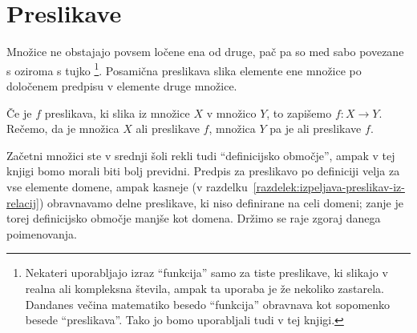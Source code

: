 \section{Preslikave}


Množice ne obstajajo povsem ločene ena od druge, pač pa so med sabo povezane s  oziroma s tujko \footnote{Nekateri uporabljajo izraz ``funkcija'' samo za tiste preslikave, ki slikajo v realna ali kompleksna števila, ampak ta uporaba je že nekoliko zastarela. Dandanes večina matematiko besedo ``funkcija'' obravnava kot sopomenko besede ``preslikava''. Tako jo bomo uporabljali tudi v tej knjigi.}. Posamična preslikava slika elemente ene množice po določenem predpisu v elemente druge množice.

Če je $f$ preslikava, ki slika iz množice $X$ v množico $Y$, to zapišemo $f\colon X \to Y$. Rečemo, da je množica $X$  ali  preslikave $f$, množica $Y$ pa je  ali  preslikave $f$.

Začetni množici ste v srednji šoli rekli tudi ``definicijsko območje'', ampak v tej knjigi bomo morali biti bolj previdni. Predpis za preslikavo po definiciji velja za vse elemente domene, ampak kasneje (v razdelku~\ref{razdelek:izpeljava-preslikav-iz-relacij}) obravnavamo delne preslikave, ki niso definirane na celi domeni; zanje je torej definicijsko območje manjše kot domena. Držimo se raje zgoraj danega poimenovanja.

